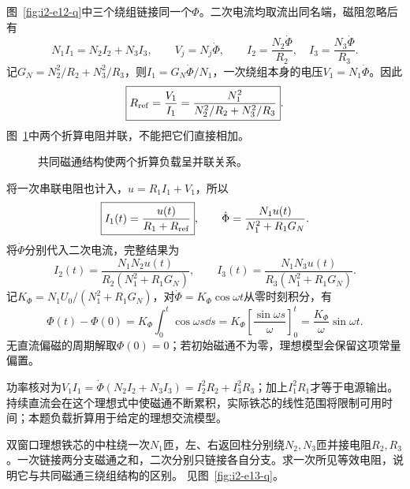 \begin{solution}
图~\ref{fig:i2-e12-q}中三个绕组链接同一个$\Phi$。二次电流均取流出同名端，磁阻忽略后有
\[N_1I_1=N_2I_2+N_3I_3,\qquad
V_j=N_j\dot\Phi,\qquad I_2=\frac{N_2\dot\Phi}{R_2},\quad
I_3=\frac{N_3\dot\Phi}{R_3}.
\]
记$G_N=N_2^2/R_2+N_3^2/R_3$，则$I_1=G_N\dot\Phi/N_1$，一次绕组本身的电压$V_1=N_1\dot\Phi$。因此
\[\boxed{R_{\rm ref}=\frac{V_1}{I_1}
=\frac{N_1^2}{N_2^2/R_2+N_3^2/R_3}}.
\]
图~\ref{fig:i2-e12-s}中两个折算电阻并联，不能把它们直接相加。


\begin{figure}[H]\centering
{}
\caption{共同磁通结构使两个折算负载呈并联关系。}\label{fig:i2-e12-s}
\end{figure}

将一次串联电阻也计入，$u=R_1I_1+V_1$，所以
\[\boxed{I_1(t)=\frac{u(t)}{R_1+R_{\rm ref}}},\qquad
\dot\Phi=\frac{N_1u(t)}{N_1^2+R_1G_N}.
\]
将$\dot\Phi$分别代入二次电流，完整结果为
\[
I_2(t)=\frac{N_1N_2u(t)}{R_2(N_1^2+R_1G_N)},\qquad
I_3(t)=\frac{N_1N_3u(t)}{R_3(N_1^2+R_1G_N)}.
\]
记$K_\Phi=N_1U_0/(N_1^2+R_1G_N)$，对$\dot\Phi=K_\Phi\cos\omega t$从零时刻积分，有
\[
\Phi(t)-\Phi(0)=K_\Phi\int_0^t\cos\omega s\dd s
=K_\Phi\left[\frac{\sin\omega s}{\omega}\right]_0^t
=\frac{K_\Phi}{\omega}\sin\omega t.
\]
无直流偏磁的周期解取$\Phi(0)=0$；若初始磁通不为零，理想模型会保留这项常量偏置。

功率核对为$V_1I_1=\dot\Phi(N_2I_2+N_3I_3)=I_2^2R_2+I_3^2R_3$；加上$I_1^2R_1$才等于电源输出。持续直流会在这个理想式中使磁通不断累积，实际铁芯的线性范围将限制可用时间；本题负载折算用于给定的理想交流模型。
\end{solution}

\begin{example}[分磁通铁芯的串联型折算]\label{ex:i2-e13}
双窗口理想铁芯的中柱绕一次$N_1$匝，左、右返回柱分别绕$N_2,N_3$匝并接电阻$R_2,R_3$。一次链接两分支磁通之和，二次分别只链接各自分支。求一次所见等效电阻，说明它与共同磁通三绕组结构的区别。 见图~\ref{fig:i2-e13-q}。
\end{example}

